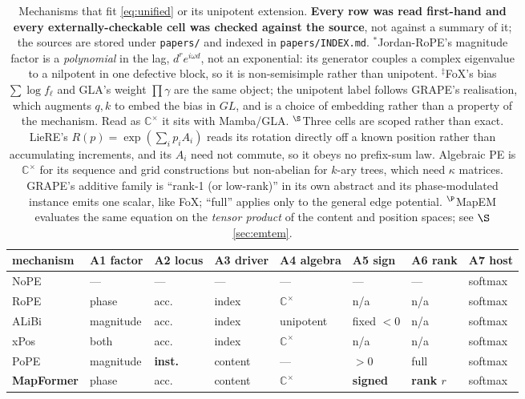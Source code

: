 \documentclass[11pt]{article}
\newcommand{\C}{\mathbb{C}}
\begin{document}
\begin{table}\small
\centering
\caption{Mechanisms that fit \eqref{eq:unified} or its unipotent extension.
\textbf{Every row was read first-hand and every externally-checkable cell was
checked against the source}, not against a summary of it; the sources are stored
under \texttt{papers/} and indexed in \texttt{papers/INDEX.md}. $^\ast$Jordan-RoPE's magnitude factor is a
\emph{polynomial} in the lag, $d^r e^{i\omega d}$, not an exponential: its
generator couples a complex eigenvalue to a nilpotent in one defective block, so
it is non-semisimple rather than unipotent. $^\ddagger$FoX's bias
$\sum\log f_\ell$ and GLA's weight $\prod\gamma$ are the same object; the unipotent
label follows GRAPE's realisation, which augments $q,k$ to embed the bias in $GL$,
and is a choice of embedding rather than a property of the mechanism. Read as
$\C^\times$ it sits with Mamba/GLA. $^{\S}$Three cells are scoped rather than
exact. LieRE's $R(p)=\exp(\sum_i p_iA_i)$ reads its rotation directly off a known
position rather than accumulating increments, and its $A_i$ need not commute, so it
obeys no prefix-sum law. Algebraic PE is $\C^\times$ for its sequence and grid
constructions but non-abelian for $k$-ary trees, which need $\kappa$ matrices.
GRAPE's additive family is ``rank-1 (or low-rank)'' in its own abstract and its
phase-modulated instance emits one scalar, like FoX; ``full'' applies only to the
general edge potential. $^{\P}$MapEM evaluates the same equation on the
\emph{tensor product} of the content and position spaces; see $\S$\ref{sec:emtem}.}
\begin{tabular}{llllllll}
\toprule
mechanism & A1 factor & A2 locus & A3 driver & A4 algebra & A5 sign & A6 rank & A7 host \\
\midrule
NoPE              & ---        & ---     & ---    & ---        & ---     & ---        & softmax \\
RoPE              & phase      & acc.    & index  & $\C^\times$ & n/a    & n/a        & softmax \\
ALiBi             & magnitude  & acc.    & index  & unipotent  & fixed $<0$ & n/a     & softmax \\
xPos              & both       & acc.    & index  & $\C^\times$ & n/a    & n/a        & softmax \\
PoPE              & magnitude  & \textbf{inst.} & content & ---  & $>0$    & full      & softmax \\
\midrule
\textbf{MapFormer} & phase     & acc.    & content & $\C^\times$ & \textbf{signed} & \textbf{rank $r$} & softmax \\

\end{tabular}
\end{table}
\end{document}
